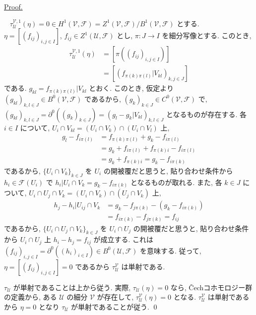 \documentclass[a4paper,10pt,dvipdfmx]{jsreport}
\renewenvironment{proof}{\begin{flushleft} \underline{Proof.} \end{flushleft}\vspace{-1zh}\ }{\qed\\}
\theoremstyle{definition}
\begin{document}
\begin{proof}
    \(\tau_\mathcal{U}^{\mathcal{V},1}(\eta) = 0 \in H^1(\mathcal{V}, \mathscr{F}) = Z^1(\mathcal{V}, \mathscr{F}) /B^1(\mathcal{V}, \mathscr{F})\) とする. \(\eta = [(f_{ij})_{i,j\in I}]\), \(f_{ij} \in Z^1(\mathcal{U},\mathscr{F})\) とし, \(\pi \colon J \to I\) を細分写像とする. このとき,
    \begin{align*}
        \tau_\mathcal{U}^{\mathcal{V},1}(\eta)
        &= [\pi((f_{ij})_{i,j\in I})]\\
        &= [(f_{\pi(k)\pi(l)}|V_{kl})_{k,j\in J}]
    \end{align*}
    である. \(g_{kl} = f_{\pi(k)\pi(l)}|V_{kl}\) とおく. このとき, 仮定より \((g_{kl})_{k,l\in J} \in B^0(\mathcal{V},\mathscr{F})\) であるから, \((g_k)_{k\in J} \in C^0(\mathcal{V},\mathscr{F})\) で, \((g_{kl})_{k,l \in J} = \partial^0((g_k)_{k\in J }) = (g_l - g_k |V_{kl})_{k,l \in J}\) となるものが存在する. 各 \(i\in I\) について, \(U_i \cap V_{kl} = (U_i \cap V_k) \cap (U_i \cap V_l)\) 上,
    \begin{align*}
        g_l - f_{i\pi(l)}
        &= f_{\pi(k)\pi(l)} + g_k - f_{i\pi(l)}\\
        &= g_k + f_{i\pi(l)} + f_{\pi(k)i} - f_{i\pi(l)}\\
        &= g_k + f_{\pi(k)i} = g_k - f_{i\pi(k)}
    \end{align*}
    であるから, \(\{U_i \cap V_k\}_{k\in J}\) を \(U_i\) の開被覆だと思うと, 貼り合わせ条件から \(h_i\in \mathscr{F}(U_i)\) で \(h_i|U_i \cap V_k = g_k - f_{i\pi(k)}\) となるものが取れる. また, 各 \(k\in J\) について, \(U_i \cap U_j \cap V_k = (U_i \cap V_k) \cap (U_j \cap V_k)\) 上,
    \begin{align*}
        h_j - h_i |U_{ij} \cap V_k
        &= g_k - f_{j\pi(k)} - (g_k - f_{i\pi(k)})\\
        &= f_{i\pi(k)} - f_{j\pi(k)} = f_{ij}
    \end{align*}
    であるから, \(\{U_i \cap U_j \cap V_k\}_{k\in J}\) を \(U_i \cap U_j\) の開被覆だと思うと, 貼り合わせ条件から \(U_i \cap U_j\) 上 \(h_i - h_j = f_{ij}\) が成立する. これは \((f_{ij})_{i,j\in I} = \partial^0((h_i)_{i\in I }) \in B^0(\mathcal{U},\mathscr{F})\) を意味する. 従って, \(\eta = [(f_{ij})_{i,j\in I}] =0 \) であるから \(\tau_\mathcal{U}^\mathcal{V}\) は単射である.

    \(\tau_\mathcal{U}\) が単射であることは上から従う. 実際, \(\tau_\mathcal{U}(\eta) = 0\) なら, \v{C}echコホモロジー群の定義から, ある \(\mathcal{U}\) の細分 \(\mathcal{V}\) が存在して, \(\tau_\mathcal{U}^\mathcal{V}(\eta) = 0\) となる. \(\tau_\mathcal{U}^\mathcal{V}\) は単射であるから \(\eta = 0\) となり \(\tau_\mathcal{U}\) が単射であることが従う.
\end{proof}
\end{document}
